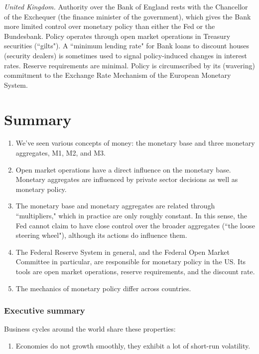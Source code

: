 \documentclass[letterpaper,12pt]{article}
\begin{document}
     {\em United Kingdom.}
Authority over the Bank of England rests with the Chancellor of the Exchequer (the finance
minister of the government), which gives the Bank more limited control over monetary policy than
either the Fed or the Bundesbank.  Policy operates through open market operations in Treasury
securities (``gilts").  A ``minimum lending rate" for Bank loans to discount houses (security
dealers) is sometimes used to signal policy-induced changes in interest rates.  Reserve
requirements are minimal.  Policy is circumscribed by its (wavering) commitment to the Exchange
Rate Mechanism of the European Monetary System.


\section*{Summary}

\begin{enumerate}
\item We've seen various concepts of money:  the monetary base and three monetary aggregates, M1,
M2, and M3.

\item Open market operations have a direct influence on the monetary base. Monetary aggregates are
influenced by private sector decisions as well as monetary policy.

\item The monetary base and monetary aggregates are related through ``multipliers," which in
practice are only roughly constant.  In this sense, the Fed cannot claim to have close control
over the broader aggregates (``the loose steering wheel"), although its actions do influence them.

\item The Federal Reserve System in general, and the Federal Open Market Committee in particular,
are responsible for monetary policy in the US.  Its tools are open market operations, reserve
requirements, and the discount rate.

\item The mechanics of monetary policy differ across countries.
\end{enumerate}





\subsubsection*{Executive summary}

Business cycles around the world share these properties:
\begin{enumerate}
\item Economies do not growth smoothly, they exhibit a lot of
short-run volatility.

\end{enumerate}
\end{document}
